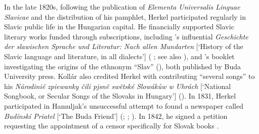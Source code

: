 In the late 1820s, following the publication of \textit{Elementa Universalis Linguae Slavicae} and the distribution of his pamphlet, Herkel participated regularly in Slavic public life in the Hungarian capital. He financially supported Slavic literary works funded through subscriptions, including \citeauthor{safarik_geschichte_1826}’s \citeyear{safarik_geschichte_1826} influential \textit{Geschichte der slawischen Sprache und Literatur: Nach allen Mundarten} [‘History of the Slavic language and literature, in all dialects’] (\citeauthor{safarik_geschichte_1826} \citeyear[520]{safarik_geschichte_1826}; see also \cite[9--10]{matovcik_vzajomna_1965}), and \citeauthor{kollar_rozprawy_1830}’s \citeyear{kollar_rozprawy_1830} booklet investigating the origins of the ethnonym “Slav” (\citeyear[no page numbers]{kollar_rozprawy_1830}), both published by Buda University press. Kollár also credited Herkel with contributing “several songs” to his \citeyear{kollar_narodinie_1835} \textit{Národinié zpiewanky čili pjsně swětské Slowákůw w Uhrách} [‘National Songbook, or Secular Songs of the Slovaks in Hungary’] (\citeyear[505]{kollar_narodinie_1835}). In 1831, Herkel participated in Hamuljak’s unsuccessful attempt to found a newspaper called \textit{Budínskí Priatel} [‘The Buda Friend’] (\cite[117]{pisut_dejiny_1960}; \cite[123]{vyvijalova_snahy_1960}; \cite[63]{ruttkay_dejiny_1999}). In 1842, he signed a petition requesting the appointment of a censor specifically for Slovak books \citep[11]{matovcik_poznamky_2002}.

